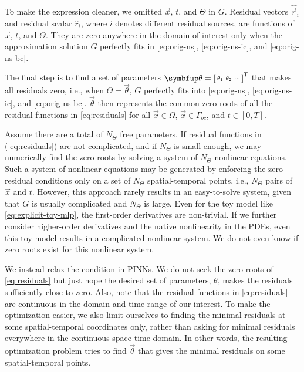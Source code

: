 To make the expression cleaner, we omitted $\vec{x}$, $t$, and $\Theta$ in $G$.
Residual vectors $\hat{\vec{r}}_i$ and residual scalar $\hat{r}_i$, where $i$ denotes different residual sources, are functions of $\vec{x}$, $t$, and $\Theta$.
They are zero anywhere in the domain of interest only when the approximation solution $G$ perfectly fits in \eqref{eq:orig-ns}, \eqref{eq:orig-ns-ic}, and \eqref{eq:orig-ns-bc}.

The final step is to find a set of parameters $\vec{\theta}=\begin{bsmallmatrix}\theta_1 & \theta_2 & \cdots\end{bsmallmatrix}^\mathsf{T}$ that makes all residuals zero, i.e., when $\Theta=\vec{\theta}$, $G$ perfectly fits into \eqref{eq:orig-ns}, \eqref{eq:orig-ns-ic}, and \eqref{eq:orig-ns-bc}.
$\vec{\theta}$ then represents the common zero roots of all the residual functions in \eqref{eq:residuals} for all $\vec{x} \in \Omega$, $\vec{x} \in \Gamma_{bc}$, and $t\in[0, T]$.

Assume there are a total of $N_\Theta$ free parameters.
If residual functions in (\ref{eq:residuals}) are not complicated, and if $N_\Theta$ is small enough, we may numerically find the zero roots by solving a system of $N_\Theta$ nonlinear equations.
Such a system of nonlinear equations may be generated by enforcing the zero-residual conditions only on a set of $N_\Theta$ spatial-temporal points, i.e., $N_\Theta$ pairs of $\vec{x}$ and $t$.
However, this approach rarely results in an easy-to-solve system, given that $G$ is usually complicated and $N_\Theta$ is large.
Even for the toy model like \eqref{eq:explicit-toy-mlp}, the first-order derivatives are non-trivial.
If we further consider higher-order derivatives and the native nonlinearity in the PDEs, even this toy model results in a complicated nonlinear system. 
We do not even know if zero roots exist for this nonlinear system.

We instead relax the condition in PINNs.
We do not seek the zero roots of \eqref{eq:residuals} but just hope the desired set of parameters, $\theta$, makes the residuals sufficiently close to zero.
Also, note that the residual functions in \eqref{eq:residuals} are continuous in the domain and time range of our interest.
To make the optimization easier, we also limit ourselves to finding the minimal residuals at some spatial-temporal coordinates only, rather than asking for minimal residuals everywhere in the continuous space-time domain. 
In other words, the resulting optimization problem tries to find $\vec{\theta}$ that gives the minimal residuals on some spatial-temporal points.


